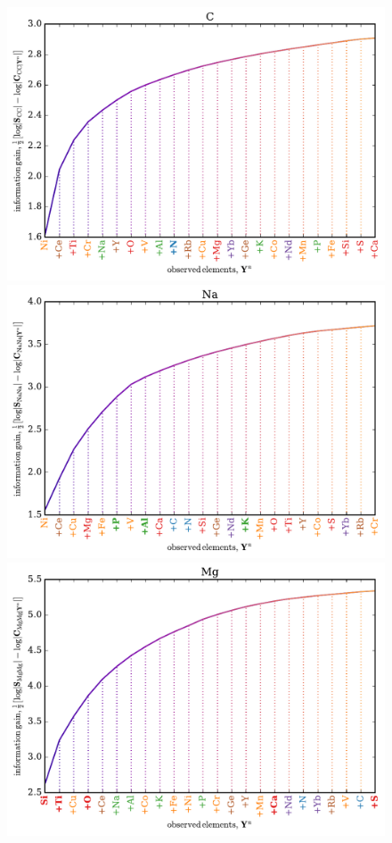 \documentclass[a4paper,fleqn,usenatbib]{mnras}
\begin{document}
\begin{figure}
	\includegraphics[width=\columnwidth]{apogee_centers_final_29502_spc_iw_prior_win_wid_1p5_c_inf_gain.pdf}
	\includegraphics[width=\columnwidth]{apogee_centers_final_29502_spc_iw_prior_win_wid_1p5_na_inf_gain.pdf}
	\includegraphics[width=\columnwidth]{apogee_centers_final_29502_spc_iw_prior_win_wid_1p5_mg_inf_gain.pdf}

\end{figure}
\end{document}
